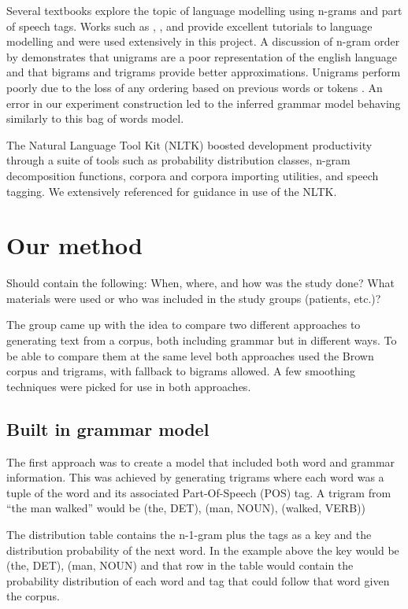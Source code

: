 \documentclass[a4paper,12pt]{article}
\begin{document}
Several textbooks explore the topic of language modelling using n-grams and part of speech tags. Works such as \cite{Jurafsky2000}, \cite{RussellNorvigAIBook3rd}, and \cite{Chen98anempirical} provide excellent tutorials to language modelling and were used extensively in this project. A discussion of n-gram order by \cite{RussellNorvigAIBook3rd} demonstrates that unigrams are a poor representation of the english language and that bigrams and trigrams provide better approximations. Unigrams perform poorly due to the loss of any ordering based on previous words or tokens \cite{RussellNorvigAIBook3rd}. An error in our experiment construction led to the inferred grammar model behaving similarly to this bag of words model.

The Natural Language Tool Kit (NLTK) boosted development productivity through a suite of tools such as probability distribution classes, n-gram decomposition functions, corpora and corpora importing utilities, and speech tagging. We extensively referenced \cite{NLTKBook09} for guidance in use of the NLTK. 

\section{Our method}
\label{sec:method}

Should contain the following: When, where, and how was the study done? What materials were used or who was included in the study groups (patients, etc.)?


The group came up with the idea to compare two different approaches to generating text from a corpus, both including grammar but in different ways. To be able to compare them at the same level both approaches used the Brown corpus and trigrams, with fallback to bigrams allowed. A few smoothing techniques were picked for use in both approaches.
\subsection{Built in grammar model}
The first approach was to create a model that included both word and grammar information. This was achieved by generating trigrams where each word was a tuple of the word and its associated Part-Of-Speech (POS) tag. A trigram from ``the man walked'' would be (the, DET), (man, NOUN), (walked, VERB))

The distribution table contains the n-1-gram plus the tags as a key and the distribution probability of the next word. In the example above the key would be (the, DET), (man, NOUN) and that row in the table would contain the probability distribution of each word and tag that could follow that word given the corpus.
\end{document}

